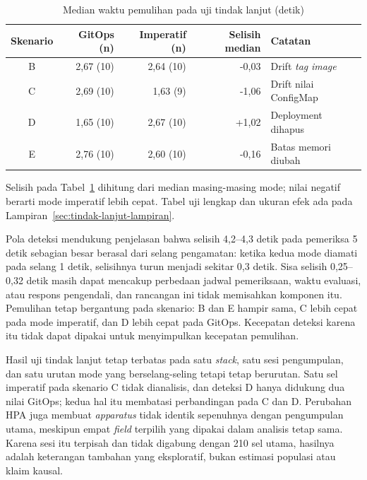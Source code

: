 \begin{table}[H]
  \centering
  \small
  \caption{Median waktu pemulihan pada uji tindak lanjut (detik)}
  \label{tab:tindak-lanjut-pemulihan}
  \begin{tabularx}{\textwidth}{|c|r|r|r|>{\raggedright\arraybackslash}X|}
    \hline
    Skenario & GitOps (n) & Imperatif (n) & Selisih median & Catatan \\
    \hline
    B & 2,67 (10) & 2,64 (10) & -0,03 & Drift \textit{tag} \textit{image} \\
    \hline
    C & 2,69 (10) & 1,63 (9) & -1,06 & Drift nilai ConfigMap \\
    \hline
    D & 1,65 (10) & 2,67 (10) & +1,02 & Deployment dihapus \\
    \hline
    E & 2,76 (10) & 2,60 (10) & -0,16 & Batas memori diubah \\
    \hline
  \end{tabularx}
\end{table}

\noindent\footnotesize Selisih pada Tabel~\ref{tab:tindak-lanjut-pemulihan} dihitung dari median masing-masing mode; nilai negatif berarti mode imperatif lebih cepat. Tabel uji lengkap dan ukuran efek ada pada Lampiran~\ref{sec:tindak-lanjut-lampiran}.\normalsize

Pola deteksi mendukung penjelasan bahwa selisih 4,2--4,3 detik pada pemeriksa 5 detik sebagian besar berasal dari selang pengamatan: ketika kedua mode diamati pada selang 1 detik, selisihnya turun menjadi sekitar 0,3 detik. Sisa selisih 0,25--0,32 detik masih dapat mencakup perbedaan jadwal pemeriksaan, waktu evaluasi, atau respons pengendali, dan rancangan ini tidak memisahkan komponen itu. Pemulihan tetap bergantung pada skenario: B dan E hampir sama, C lebih cepat pada mode imperatif, dan D lebih cepat pada GitOps. Kecepatan deteksi karena itu tidak dapat dipakai untuk menyimpulkan kecepatan pemulihan.

Hasil uji tindak lanjut tetap terbatas pada satu \textit{stack}, satu sesi pengumpulan, dan satu urutan mode yang berselang-seling tetapi tetap berurutan. Satu sel imperatif pada skenario C tidak dianalisis, dan deteksi D hanya didukung dua nilai GitOps; kedua hal itu membatasi perbandingan pada C dan D. Perubahan HPA juga membuat \textit{apparatus} tidak identik sepenuhnya dengan pengumpulan utama, meskipun empat \textit{field} terpilih yang dipakai dalam analisis tetap sama. Karena sesi itu terpisah dan tidak digabung dengan 210 sel utama, hasilnya adalah keterangan tambahan yang eksploratif, bukan estimasi populasi atau klaim kausal.

